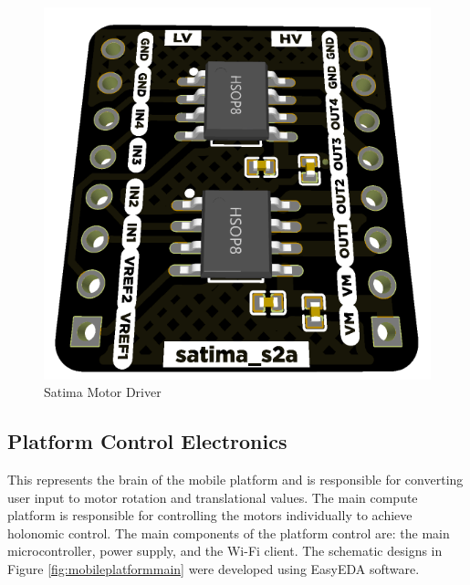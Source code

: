 \begin{figure}[H]
    \centering
    \includegraphics[scale = 0.4]{Figures/satimaDriver.png}
    \caption{Satima Motor Driver}
    \label{fig:satimaDriver}
\end{figure}


\subsection{Platform Control Electronics}
\label{sec:platformControl}

This represents the brain of the mobile platform and is responsible for converting user input to motor rotation and translational values. The main compute platform is responsible for controlling the motors individually to achieve holonomic control.
The main components of the platform control are: the main microcontroller, power supply, and the Wi-Fi client. The schematic designs in Figure \ref{fig:mobileplatformmain} were developed using EasyEDA software.

